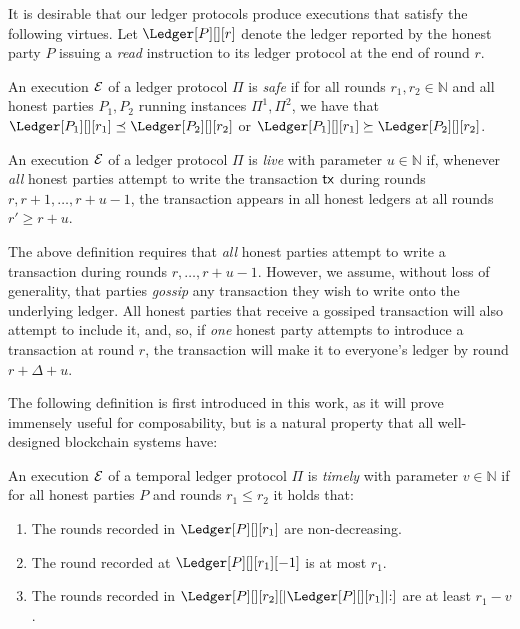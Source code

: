 It is desirable that our
ledger protocols produce executions that satisfy the following virtues.
Let $\Ledger[P][][r]$ denote the ledger reported by the honest party $P$
issuing a \emph{read} instruction to its ledger protocol at the end of round $r$.

\begin{definition}[Safe]
  An execution $\mathcal{E}$ of a ledger protocol $\Pi$ is \emph{safe} if for all rounds $r_1, r_2 \in \mathbb{N}$
  and all honest parties $P_1, P_2$ running instances $\Pi^1, \Pi^2$,
  we have that
  $\Ledger[P_1][][r_1] \preceq \Ledger[P_2][][r_2]$ or
  $\Ledger[P_1][][r_1] \succeq \Ledger[P_2][][r_2]$.
\end{definition}


\begin{definition}[Live]
  An execution $\mathcal{E}$ of a ledger protocol $\Pi$ is \emph{live} with parameter $u \in \mathbb{N}$ if, whenever
  \emph{all} honest parties attempt to write the transaction $\textsf{tx}$ during
  rounds $r, r + 1, \ldots, r + u - 1$, the transaction appears in all
  honest ledgers at all rounds $r' \geq r + u$.
\end{definition}

The above definition requires that \emph{all} honest parties attempt to
write a transaction during rounds $r, \ldots, r + u - 1$. However, we
assume, without loss of generality,
that parties \emph{gossip} any transaction they wish to write onto
the underlying ledger. All honest parties that receive a gossiped transaction
will also attempt to include it, and, so, if \emph{one} honest party
attempts to introduce a transaction at round $r$, the transaction will
make it to everyone's ledger by round $r + \Delta + u$.

The following definition is first introduced in this work, as it will prove
immensely useful for composability, but is a natural property that all well-designed
blockchain systems have:

\begin{definition}[Timely]\label{def:timely}
  An execution $\mathcal{E}$ of a temporal ledger protocol $\Pi$ is \emph{timely} with parameter $v \in \mathbb{N}$
  if for all honest parties $P$ and rounds $r_1 \leq r_2$ it holds that:

  \begin{enumerate}
    \item The rounds recorded in $\Ledger[P][][r_1]$ are non-decreasing.\label{def:timely-increasing}
    \item The round recorded at $\Ledger[P][][r_1][-1]$ is at most $r_1$.\label{def:timely-past}
    \item The rounds recorded in $\Ledger[P][][r_2][|\Ledger[P][][r_1]|{:}]$ are at least $r_1 - v$.\label{def:timely-chunk}
  \end{enumerate}
\end{definition}

